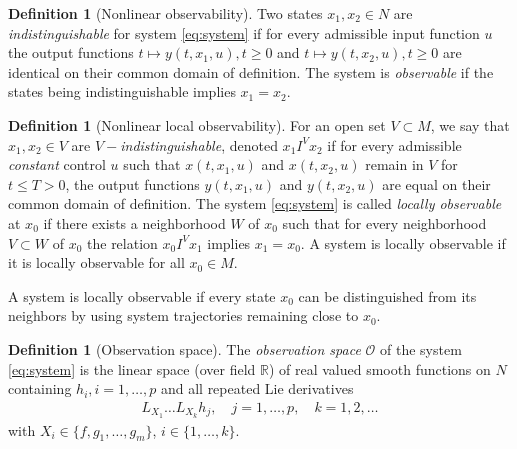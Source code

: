 \documentclass[psamsfonts]{amsart}
\theoremstyle{definition}
\newtheorem{defn}[thm]{Definition}
\theoremstyle{remark}
\newcommand*\R{\mathds{R}}
\numberwithin{equation}{section}
\begin{document}
\begin{defn}[Nonlinear observability]
    Two states $x_1, x_2\in N$ are \textit{indistinguishable} for system \eqref{eq:system} if for every admissible input function $u$ the output functions $t\mapsto y(t, x_1, u), t\geq 0$ and $t\mapsto y(t, x_2, u), t\geq 0$ are identical on their common domain of definition. The system is \textit{observable} if the states being indistinguishable implies $x_1=x_2$. 
\end{defn}

\begin{defn}[Nonlinear local observability]
    For an open set $V\subset M$, we say that $x_1, x_2 \in V$ are \textit{$V-$indistinguishable}, denoted $x_1 I^V x_2$ if for every admissible \textit{constant} control $u$ such that $x(t, x_1, u)$ and $x(t, x_2, u)$ remain in $V$ for $t\leq T > 0$, the output functions $y(t, x_1, u)$ and $y(t, x_2, u)$ are equal on their common domain of definition. The system \eqref{eq:system} is called \textit{locally observable} at $x_0$ if there exists a neighborhood $W$ of $x_0$ such that for every neighborhood $V\subset W$ of $x_0$ the relation $x_0 I^V x_1$ implies $x_1 = x_0$. A system is locally observable if it is locally observable for all $x_0 \in M$. 
\end{defn}

A system is locally observable if every state $x_0$ can be distinguished from its neighbors by using system trajectories remaining close to $x_0$. 

\begin{defn}[Observation space]
    The \textit{observation space} $\mathscr{O}$ of the system \eqref{eq:system} is the linear space (over field $\R$) of real valued smooth functions on $N$ containing $h_i, i = 1, \dots, p$ and all repeated Lie derivatives 
    \begin{align}
        L_{X_1}\dots L_{X_k}h_j, \quad j = 1,\dots, p, \quad k = 1,2, \dots
    \end{align}
    with $X_i \in \{f, g_1, \dots, g_m\}$, $i\in\{1, \dots, k\}$. 
\end{defn}
\end{document}
